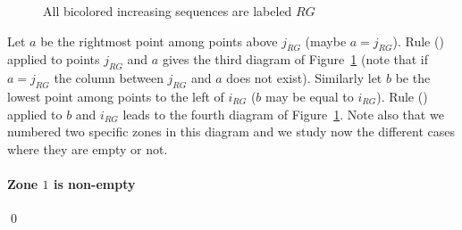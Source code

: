 \documentclass[11pt]{article}
\newenvironment{pf}{{\em \noindent Proof:}}{ \hfill \qed\smallskip}
\newcommand{\rmnum}[1]{\romannumeral #1}
\newcommand{\Vpoint}[2]{\draw (#1,#2) [darkgreen,fill=darkgreen] circle (3pt);}
\newcommand{\Hpoint}[2]{\draw (#1,#2) [darkred,fill=darkred] circle (3pt);}
\newcommand{\zoneRG}[3]{
\draw [very thick,H,Hpoint] (#1,#2) -- +(-#3,0);
\draw [very thick,V,Vpoint] (#1,#2) -- +(0,#3);
\draw [Hfill] (#1,#2) -- +(-#3,#3) -- +(-#3,0);
\draw [Vfill] (#1,#2) -- +(-#3,#3) -- + (0,#3);
}
\begin{document}
\begin{pf}
\begin{figure}[H]
\begin{center}

\caption{All bicolored increasing sequences are labeled $RG$\label{fig:tikz2RG}}
\end{center}
\end{figure}


Let $a$ be the rightmost point among points above $j_{RG}$ (maybe $a = j_{RG}$). Rule (\rmnum{1}) applied to points $j_{RG}$ and $a$ gives the third diagram of Figure~\ref{fig:tikz2RG} (note that if $a=j_{RG}$ the column between $j_{RG}$ and $a$ does not exist).
Similarly let $b$ be the lowest point among points to the left of $i_{RG}$ ($b$ may be equal to $i_{RG}$). Rule (\rmnum{2}) applied to $b$ and $i_{RG}$ leads to the fourth diagram of Figure~\ref{fig:tikz2RG}. Note also that we numbered two specific zones in this diagram and we study now the different cases where they are empty or not.

\paragraph{Zone $1$ is non-empty}


\end{pf}
\end{document}
